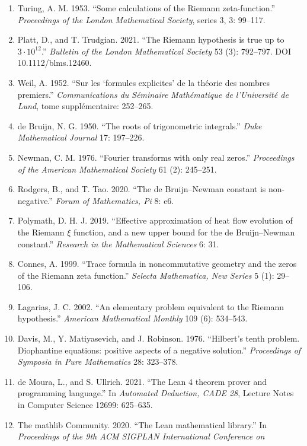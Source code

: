 \documentclass[10pt]{article}
\newenvironment{refsblock}{\par\small}{\par}
\begin{document}
\begin{refsblock}
\begin{enumerate}
{  und angewandte Mathematik} 399: 1--26.
\item
  Turing, A. M. 1953. ``Some calculations of the Riemann
  zeta-function.'' \emph{Proceedings of the London Mathematical
  Society}, series 3, 3: 99--117.
\item
  Platt, D., and T. Trudgian. 2021. ``The Riemann hypothesis is true up
  to \(3\cdot 10^{12}\).'' \emph{Bulletin of the London Mathematical
  Society} 53 (3): 792--797. DOI 10.1112/blms.12460.
\item
  Weil, A. 1952. ``Sur les `formules explicites' de la théorie des
  nombres premiers.'' \emph{Communications du Séminaire Mathématique de
  l'Université de Lund}, tome supplémentaire: 252--265.
\item
  de Bruijn, N. G. 1950. ``The roots of trigonometric integrals.''
  \emph{Duke Mathematical Journal} 17: 197--226.
\item
  Newman, C. M. 1976. ``Fourier transforms with only real zeros.''
  \emph{Proceedings of the American Mathematical Society} 61 (2):
  245--251.
\item
  Rodgers, B., and T. Tao. 2020. ``The de Bruijn--Newman constant is
  non-negative.'' \emph{Forum of Mathematics, Pi} 8: e6.
\item
  Polymath, D. H. J. 2019. ``Effective approximation of heat flow
  evolution of the Riemann \(\xi\) function, and a new upper bound for
  the de Bruijn--Newman constant.'' \emph{Research in the Mathematical
  Sciences} 6: 31.
\item
  Connes, A. 1999. ``Trace formula in noncommutative geometry and the
  zeros of the Riemann zeta function.'' \emph{Selecta Mathematica, New
  Series} 5 (1): 29--106.
\item
  Lagarias, J. C. 2002. ``An elementary problem equivalent to the
  Riemann hypothesis.'' \emph{American Mathematical Monthly} 109 (6):
  534--543.
\item
  Davis, M., Y. Matiyasevich, and J. Robinson. 1976. ``Hilbert's tenth
  problem. Diophantine equations: positive aspects of a negative
  solution.'' \emph{Proceedings of Symposia in Pure Mathematics} 28:
  323--378.
\item
  de Moura, L., and S. Ullrich. 2021. ``The Lean 4 theorem prover and
  programming language.'' In \emph{Automated Deduction, CADE 28},
  Lecture Notes in Computer Science 12699: 625--635.
\item
  The mathlib Community. 2020. ``The Lean mathematical library.'' In
  \emph{Proceedings of the 9th ACM SIGPLAN International Conference on
}
\end{enumerate}
\end{refsblock}
\end{document}
